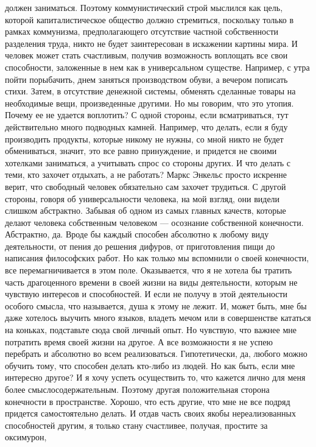 должен заниматься. Поэтому коммунистический строй мыслился как цель, которой
капиталистическое общество должно стремиться, поскольку только в рамках
коммунизма, предполагающего отсутствие частной собственности разделения труда,
никто не будет заинтересован в искажении картины мира. И человек может стать
счастливым, получив возможность воплощать все свои способности, заложенные в нем
как в универсальном существе. Например, с утра пойти порыбачить, днем заняться
производством обуви, а вечером пописать стихи. Затем, в отсутствие денежной
системы, обменять сделанные товары на необходимые вещи, произведенные другими.
Но мы говорим, что это утопия. Почему ее не удается воплотить? С одной стороны,
если всматриваться, тут действительно много подводных камней. Например, что
делать, если я буду производить продукты, которые никому не нужны, со мной никто
не будет обмениваться, значит, это все равно принуждение, и придется не своими
хотелками заниматься, а учитывать спрос со стороны других. И что делать с теми,
кто захочет отдыхать, а не работать? Маркс Энкельс просто искренне верит, что
свободный человек обязательно сам захочет трудиться. С другой стороны, говоря об
универсальности человека, на мой взгляд, они видели слишком абстрактно. Забывая
об одном из самых главных качеств, которые делают человека собственным человеком
— осознание собственной конечности. Абстрактно, да. Вроде бы каждый способен
абсолютно к любому виду деятельности, от пения до решения дифуров, от
приготовления пищи до написания философских работ. Но как только мы вспомнили о
своей конечности, все перемагничивается в этом поле. Оказывается, что я не
хотела бы тратить часть драгоценного времени в своей жизни на виды деятельности,
которым не чувствую интересов и способностей. И если не получу в этой
деятельности особого смысла, что называется, душа к этому не лежит. И, может
быть, мне бы даже хотелось выучить много языков, владеть мечом или в
совершенстве кататься на коньках, подставьте сюда свой личный опыт. Но чувствую,
что важнее мне потратить время своей жизни на другое. А все возможности я не
успею перебрать и абсолютно во всем реализоваться. Гипотетически, да, любого
можно обучить тому, что способен делать кто-либо из людей. Но как быть, если мне
интересно другое? И я хочу успеть осуществить то, что кажется лично для меня
более смыслосодержательным. Поэтому другая положительная сторона конечности в
пространстве. Хорошо, что есть другие, что мне не все подряд придется
самостоятельно делать. И отдав часть своих якобы нереализованных способностей
другим, я только стану счастливее, получая, простите за оксимурон,
